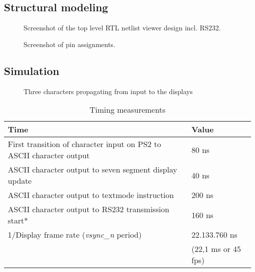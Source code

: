 \documentclass[12pt,a4paper,titlepage,oneside]{article}
\begin{document}
\maketitle

\subsection*{Structural modeling}
\begin{figure}[ht!]
  \centering
  \caption{Screenshot of the top level RTL netlist viewer design incl. RS232.}
\end{figure}

\begin{figure}[ht!]
  \centering
  \caption{Screenshot of pin assignments.}
\end{figure}

\newpage
\subsection*{Simulation}

\begin{figure}[ht!]
  \centering
  \caption{Three characters propagating from input to the displays}
\end{figure}

\begin{table}[ht!]
  \centering
  \caption{Timing measurements}
  \begin{tabular}{|l|l|}
    \hline
    Time                                                                 & Value  \\ \hline 
    First transition of character input on PS2 to ASCII character output & 80 ns   \\
    ASCII character output to seven segment display update               & 40 ns   \\
    ASCII character output to textmode instruction                       & 200 ns   \\
    ASCII character output to RS232 transmission start*					 & 160 ns \\ \hline
    1/Display frame rate (\emph{vsync\_n} period)                        & 22.133.760 ns \\	
    																	 & (22,1 ms or 45 fps)   \\ \hline
  \end{tabular}
\end{table}
\end{document}
